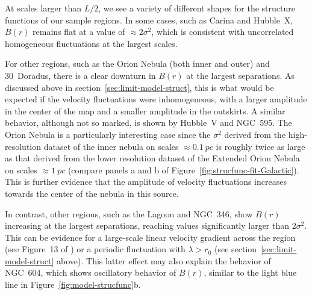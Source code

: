 \documentclass[fleqn,usenatbib, useAMS, a4paper]{mnras}
\newcommand\ha{\ensuremath{\text{H}\alpha}}
\begin{document}
At scales larger than \(L/2\),
we see a variety of different shapes for the structure functions
of our sample regions. 
In some cases,
such as Carina and Hubble~X,
\(B(r)\) remains flat at a value of \(\approx 2\sigma^2\),
which is consistent with uncorrelated homogeneous fluctuations
at the largest scales.

For other regions,
such as the Orion Nebula (both inner and outer) and 30~Doradus,
there is a clear downturn in \(B(r)\) at the largest separations.
As discussed above in section~\ref{sec:limit-model-struct},
this is what would be expected if the velocity fluctuations
were inhomogeneous, with a larger amplitude in the center of the map
and a smaller amplitude in the outskirts.
A similar behavior, although not so marked, is shown by
Hubble~V and NGC~595.
The Orion Nebula is a particularly interesting case
since the \(\sigma^2\) derived from the high-resolution dataset of the inner nebula on scales \(\approx \SI{0.1}{pc}\)
is roughly twice as large as that derived from the lower resolution
dataset of the Extended Orion Nebula on scales \(\approx \SI{1}{pc}\)
(compare panels a and b of Figure~\ref{fig:strucfunc-fit-Galactic}).
This is further evidence that the amplitude of velocity fluctuations
increases towards the center of the nebula in this source.

In contrast, other regions,
such as the Lagoon and NGC~346,
show \(B(r)\) increasing at the largest separations,
reaching values significantly larger than \(2\sigma^2\).
This can be evidence for a large-scale linear velocity gradient
across the region (see Figure~13 of \citealp{arthur2016turbulence})
or a periodic fluctuation with \(\lambda > r_0\)
(see section~\ref{sec:limit-model-struct} above).
This latter effect may also explain the behavior of NGC~604,
which shows oscillatory behavior of \(B(r)\),
similar to the light blue line in Figure~\ref{fig:model-strucfunc}b.


\end{document}
